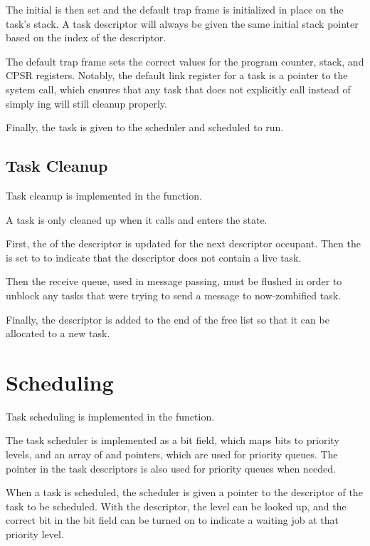 \documentclass[pdftex,10pt,a4paper]{article}
\begin{document}
The initial  is then set and the default trap frame is
initialized in place on the task's stack. A task descriptor will
always be given the same initial stack pointer based on the index of
the descriptor.

The default trap frame sets the correct values for the program
counter, stack, and CPSR registers. Notably, the default link register
for a task is a pointer to the  system call, which ensures
that any task that does not explicitly call  instead of
simply ing will still cleanup properly.

Finally, the task is given to the scheduler and scheduled to run.

\subsection*{Task Cleanup}

Task cleanup is implemented in the  function.

A task is only cleaned up when it calls  and enters the
 state.

First, the  of the descriptor is updated for the next
descriptor occupant. Then the  is set to  to
indicate that the descriptor does not contain a live task.

Then the receive queue, used in message passing, must be flushed in
order to unblock any tasks that were trying to send a message to
now-zombified task.

Finally, the descriptor is added to the end of the free list so that
it can be allocated to a new task.


\section*{Scheduling}

Task scheduling is implemented in the 
function.

The task scheduler is implemented as a bit field, which maps bits to
priority levels, and an array of  and  pointers,
which are used for priority queues. The  pointer in the task
descriptors is also used for priority queues when needed.

When a task is scheduled, the scheduler is given a pointer to the
descriptor of the task to be scheduled. With the descriptor, the
 level can be looked up, and the correct bit in the bit
field can be turned on to indicate a waiting job at that priority
level.
\end{document}
